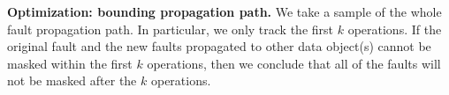 \begin{comment}
To collect valid intermediate states to accelerate the fault propagation analysis,  
we record the values of some variables (e.g., the values of $alpha$ at the statement $D$) with fault-free execution. %
We record valid values of a variable if a value of the variable in DDG has at least 10 predecessor nodes.
Recording those values is useful, because it is potentially helpful to resolve many pending fault propagation analysis.
\end{comment}

\begin{comment}
We choose those operations to output the values, because 
those operations maximize the fanout of data corruption, 
and hence have big potential to result in the above fault propagation problem.
(\textbf{Dong: explain more what is fanout}).

\textbf{Fanout: the fanout of a node is the set of all immediate successors of the node in DDG. The fanout of a node indicates how many nodes are directly impacted by an fault in that node.}
\end{comment}


\textbf{Optimization: bounding propagation path.} 
We take a sample of the whole fault propagation path.
In particular, we only track the first $k$ operations. 
If the original fault and the new faults propagated to other data object(s)
cannot be masked within the first $k$ operations, then we conclude that 
all of the faults will not be masked after the $k$ operations.

